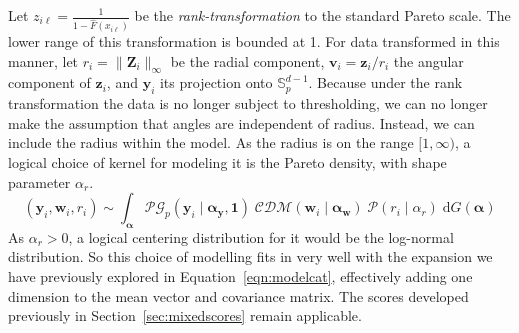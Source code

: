 Let $z_{i\ell} = \frac{1}{1 - \hat{F}(x_{i\ell})}$ be the 
    \emph{rank-transformation} to the standard Pareto scale.  The lower range 
    of this transformation is bounded at 1. For data transformed in this manner, 
    let $r_i = \lVert \bm{Z}_i\rVert_{\infty}$ be the radial component, 
    $\bm{v}_i = \bm{z}_i/r_i$ the angular component of $\bm{z}_i$, and 
    $\bm{y}_i$ its projection onto $\mathbb{S}_p^{d-1}$.  Because under the 
    rank transformation the data is no longer subject to thresholding, we can 
    no longer make the assumption that angles are independent of radius.
    Instead, we can include the radius within the model.  As the radius is on 
    the range $[1,\infty)$, a logical choice of kernel for modeling it is the 
    Pareto density, with shape parameter $\alpha_r$.  
    \begin{equation}
        \label{model:rank}
        (\bm{y}_i,\bm{w}_i,r_i) \sim \int_{\bm{\alpha}}
            \mathcal{PG}_p(\bm{y}_i\mid\bm{\alpha}_{\bm{y}}, \bm{1})\;
            \mathcal{CDM}(\bm{w}_i\mid\bm{\alpha}_{\bm{w}})\;
            \mathcal{P}(r_i\mid\alpha_r)\;
            \text{d}G(\bm{\alpha})
    \end{equation}
    As $\alpha_r > 0$, a logical centering distribution for it would be the 
    log-normal distribution.  So this choice of modelling fits in very well 
    with the expansion we have previously explored in 
    Equation~\ref{eqn:modelcat}, effectively adding one dimension to the mean 
    vector and covariance matrix.  The scores developed previously in 
    Section~\ref{sec:mixedscores} remain applicable.

